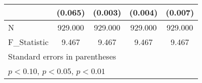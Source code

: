 {\begin{tabular}{l*{4}{c}}
            &     (0.065)         &     (0.003)         &     (0.004)         &     (0.007)         \\
\hline
N           &     929.000         &     929.000         &     929.000         &     929.000         \\
F\_Statistic &       9.467         &       9.467         &       9.467         &       9.467         \\
\hline\hline
\multicolumn{5}{l}{\footnotesize Standard errors in parentheses}\\
\multicolumn{5}{l}{\footnotesize \sym{*} \(p<0.10\), \sym{**} \(p<0.05\), \sym{***} \(p<0.01\)}\\
\end{tabular}
}
